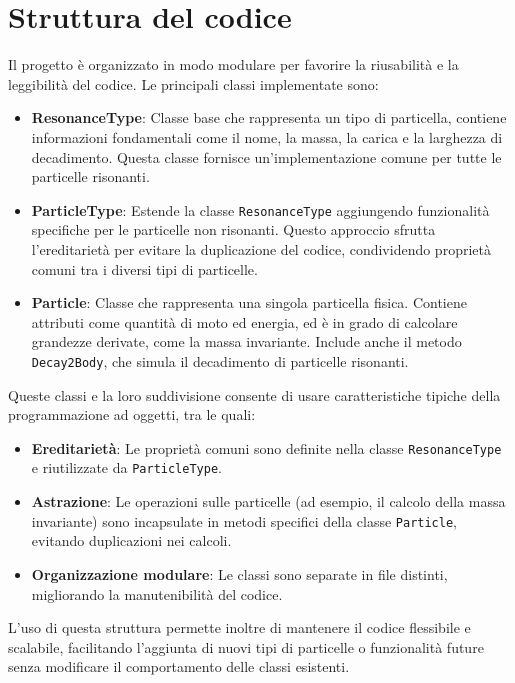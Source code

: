 \documentclass[a4paper,11pt]{article}
\begin{document}
\clearpage

\section{Struttura del codice}

Il progetto è organizzato in modo modulare per favorire la riusabilità e la leggibilità del codice. Le principali classi implementate sono:

\begin{itemize}
    \item \textbf{ResonanceType}: Classe base che rappresenta un tipo di particella, contiene informazioni fondamentali come il nome, la massa, la carica e la larghezza di decadimento. Questa classe fornisce un'implementazione comune per tutte le particelle risonanti.
    \item \textbf{ParticleType}: Estende la classe \texttt{ResonanceType} aggiungendo funzionalità specifiche per le particelle non risonanti. Questo approccio sfrutta l'ereditarietà per evitare la duplicazione del codice, condividendo proprietà comuni tra i diversi tipi di particelle.
    \item \textbf{Particle}: Classe che rappresenta una singola particella fisica. Contiene attributi come quantità di moto ed energia, ed è in grado di calcolare grandezze derivate, come la massa invariante. Include anche il metodo \texttt{Decay2Body}, che simula il decadimento di particelle risonanti.
\end{itemize}

Queste classi e la loro suddivisione consente di usare caratteristiche tipiche della programmazione ad oggetti, tra le quali:

\begin{itemize}
    \item \textbf{Ereditarietà}: Le proprietà comuni sono definite nella classe \texttt{ResonanceType} e riutilizzate da \texttt{ParticleType}.
    \item \textbf{Astrazione}: Le operazioni sulle particelle (ad esempio, il calcolo della massa invariante) sono incapsulate in metodi specifici della classe \texttt{Particle}, evitando duplicazioni nei calcoli.
    \item \textbf{Organizzazione modulare}: Le classi sono separate in file distinti, migliorando la manutenibilità del codice.
\end{itemize}

L'uso di questa struttura permette inoltre di mantenere il codice flessibile e scalabile, facilitando l'aggiunta di nuovi tipi di particelle o funzionalità future senza modificare il comportamento delle classi esistenti.
\end{document}
